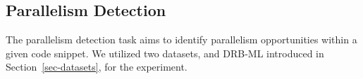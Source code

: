 



\subsection{Parallelism Detection}
\vspace{-5pt}
The parallelism detection task aims to identify parallelism opportunities within a given code snippet. We utilized two datasets, \crawldata  and DRB-ML introduced in Section~\ref{sec-datasets}, for the experiment. 


